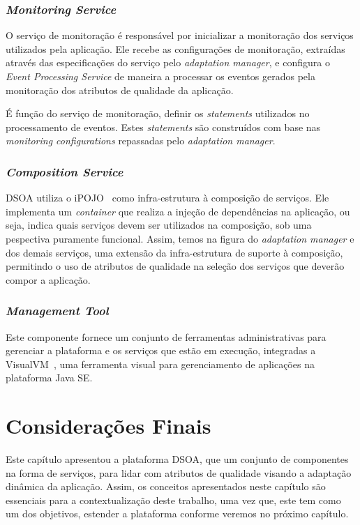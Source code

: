 \subsubsection{\textit{Monitoring Service}}
\label{subsec:monit_serv}
O serviço de monitoração é responsável por inicializar a monitoração dos serviços utilizados pela aplicação. Ele recebe as configurações de monitoração, extraídas através das especificações do serviço pelo \textit{adaptation manager}, e configura o \textit{Event Processing Service} de maneira a processar os eventos gerados pela monitoração dos atributos de qualidade da aplicação.

É função do serviço de monitoração, definir os \textit{statements} utilizados no processamento de eventos. Estes \textit{statements} são construídos com base nas \textit{monitoring configurations} repassadas pelo \textit{adaptation manager}.

\subsubsection{\textit{Composition Service}}
DSOA utiliza o iPOJO~\cite{ipojo} como infra-estrutura à composição de serviços. Ele implementa um \textit{container} que realiza a injeção de dependências na aplicação, ou seja, indica quais serviços devem ser utilizados na composição, sob uma pespectiva puramente funcional. Assim, temos na figura do \textit{adaptation manager} e dos demais serviços, uma extensão da infra-estrutura de suporte à composição, permitindo o uso de atributos de qualidade na seleção dos serviços que deverão compor a aplicação.

\subsubsection{\textit{Management Tool}}
Este componente fornece um conjunto de ferramentas administrativas para gerenciar a plataforma e os serviços que estão em execução, integradas a VisualVM~\cite{visualvm}, uma ferramenta visual para gerenciamento de aplicações na plataforma Java SE.

\section{Considerações Finais}
Este capítulo apresentou a plataforma DSOA, que um conjunto de componentes na forma de serviços, para lidar com atributos de qualidade visando a adaptação dinâmica da aplicação. Assim, os conceitos apresentados neste capítulo são essenciais para a contextualização deste trabalho, uma vez que, este tem como um dos objetivos, estender a plataforma conforme veremos no próximo capítulo.